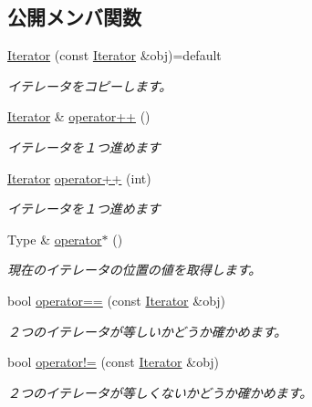 \subsection*{公開メンバ関数}
\begin{DoxyCompactItemize}
\item 
\hyperlink{class_dynamic_array_1_1_iterator_a46b8c9ccfaaba3050783ae871fa8ddf0}{Iterator} (const \hyperlink{class_dynamic_array_1_1_iterator}{Iterator} \&obj)=default
\begin{DoxyCompactList}\small\item\em イテレータをコピーします。\end{DoxyCompactList}\item 
\hyperlink{class_dynamic_array_1_1_iterator}{Iterator} \& \hyperlink{class_dynamic_array_1_1_iterator_a490ce9a02523d09f66d7995b8fe8f6fc}{operator++} ()
\begin{DoxyCompactList}\small\item\em イテレータを１つ進めます\end{DoxyCompactList}\item 
\hyperlink{class_dynamic_array_1_1_iterator}{Iterator} \hyperlink{class_dynamic_array_1_1_iterator_abdb0348b15367467686e168f17080bd9}{operator++} (int)
\begin{DoxyCompactList}\small\item\em イテレータを１つ進めます\end{DoxyCompactList}\item 
Type \& \hyperlink{class_dynamic_array_1_1_iterator_a5bd348cd1b665af45f5b591eb63fa602}{operator$\ast$} ()
\begin{DoxyCompactList}\small\item\em 現在のイテレータの位置の値を取得します。\end{DoxyCompactList}\item 
bool \hyperlink{class_dynamic_array_1_1_iterator_ab7e083ee8a067de130bf3a48752b05e5}{operator==} (const \hyperlink{class_dynamic_array_1_1_iterator}{Iterator} \&obj)
\begin{DoxyCompactList}\small\item\em ２つのイテレータが等しいかどうか確かめます。\end{DoxyCompactList}\item 
bool \hyperlink{class_dynamic_array_1_1_iterator_ac72b09c796d6eb985f28048877a07057}{operator!=} (const \hyperlink{class_dynamic_array_1_1_iterator}{Iterator} \&obj)
\begin{DoxyCompactList}\small\item\em ２つのイテレータが等しくないかどうか確かめます。\end{DoxyCompactList}\end{DoxyCompactItemize}
